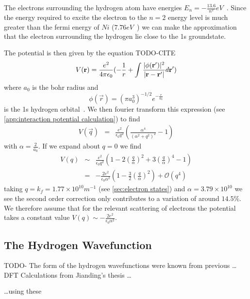 The electrons surrounding the hydrogen
atom have energies
\(E_n = -\frac{13.6}{n^2} eV\)~\cite{griffiths_schroeter_2018}.
Since the energy required to excite the electron
to the \(n=2\) energy level is much greater
than the fermi energy of \(Ni\)
(\(7.76eV\)~\cite{PhysRev.131.2469}) we can
make the approximation that the electron surrounding
the hydrogen lie close to the 1s groundstate.

The potential is then given by the equation TODO-CITE
\begin{equation}
  V(\mathbf{r}) = \frac{e^2}{4 \pi \epsilon_0}(
  -\frac{1}{r}
  + \int{\frac{\lvert\phi(\mathbf{r}')\rvert^2}{
      \lvert\mathbf{r} - \mathbf{r'}\rvert} d\mathbf{r}'})
\end{equation}
where \(a_0\) is
the bohr radius and
\begin{equation}
  \phi(\vec{r}) = {(\pi a_0^3)}^{-1/2} e^{-\frac{r}{a_0}}
\end{equation}
is the 1s hydrogen orbital~\cite{griffiths_schroeter_2018}.
We then fourier
transform this expression
(see \cref{app:interaction potential calculation})
to find
\begin{eqnarray}
  V(\vec{q}) &=& \frac{e^2}{\epsilon_0 q^2}(
  \frac{\alpha^4}{{(\alpha^2 + q^2)}^2} - 1
  )
\end{eqnarray}
with \(\alpha = \frac{2}{a_0}\). If we expand
about \(q=0\) we find
\begin{eqnarray}
  V(q) &\sim&\frac{e^2}{\epsilon_0 q^2}(1 - 2{(\frac{q}{\alpha})}^2 + 3 {(\frac{q}{\alpha})}^4 - 1)\\
  {} &=& -\frac{2e^2}{\epsilon_0 \alpha^2}(1 - \frac{3}{2}{(\frac{q}{\alpha})}^2) + \mathcal{O}(q^4)
\end{eqnarray}
taking \(q = k_f = 1.77\times{}10^{10}m^{-1}\)
(see \cref{sec:electron states})
and \(\alpha = 3.79\times{}10^{10}\) we see the second
order correction only contributes to a variation
of around \(14.5\% \).
We therefore assume that for the relevant scattering
of electrons the potential takes a constant
value \(V(q) \sim -\frac{2e^2}{\epsilon_0 \alpha^2}\).

\subsection{The Hydrogen Wavefunction}
TODO-
The form of the hydrogen wavefunctions were
known from previous \ldots DFT Calculations from Jianding's thesis \ldots


\ldots using these

